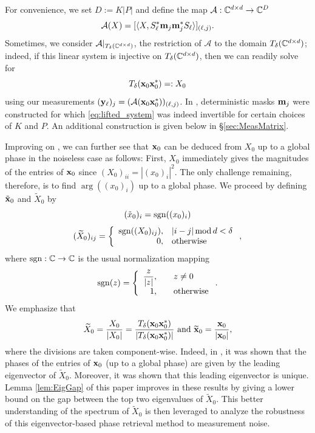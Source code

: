 For convenience, we set $D := K|P|$ and define the map $\mathcal{A} : \mathbb{C}^{d \times d} \to \mathbb{C}^D$ 
\begin{equation}\mathcal{A}(X) = [\langle X, S_\ell^* \mathbf m_j \mathbf m_j^* S_\ell \rangle]_{(\ell, j)}.\label{eq:linear}\end{equation}  
Sometimes, we consider $\mathcal{A}|_{T_{\delta}(\mathbb{C}^{d \times d})}$, the restriction of $\mathcal{A}$ to the domain $T_{\delta}(\mathbb{C}^{d \times d})$; indeed, if this linear system is injective on $T_\delta(\mathbb{C}^{d \times d})$, then we can readily solve for 
\begin{equation}T_\delta(\mathbf x_0 \mathbf x_0^*) =: X_0 \label{equdef:X0} \end{equation}  
using our measurements $(\mathbf y_\ell)_j = (\mathcal{A}(\mathbf x_0 \mathbf x_0^*))_{(\ell,j)}$.
In \cite{IVW2015_FastPhase}, deterministic masks $\mathbf m_j$ were constructed for which \eqref{eq:lifted_system} was indeed invertible for certain choices of $K$ and $P$.  An additional construction is given below in \S\ref{sec:MeasMatrix}.

Improving on \cite{IVW2015_FastPhase}, we can further see that $\mathbf x_0$ can be deduced from $X_0$ up to a global phase in the noiseless case as follows:  First, $X_0$ immediately gives the magnitudes of the entries of $\mathbf x_0$ since $(X_0)_{ii} = |(x_0)_i|^2$.  
The only challenge remaining, therefore, is to find $\arg((x_0)_i)$ up to a global phase.  We proceed by defining $\tilde{\mathbf x}_0$ and $\widetilde{X}_0$ by \[(\tilde{x}_0)_i = \mathrm{sgn}((x_0)_i)\] \[(\widetilde{X}_0)_{ij} = \left\{\begin{array}{r@{,\quad}l} \sgn((X_0)_{ij}) & |i - j| \mod d < \delta \\ 0 & \text{otherwise} \end{array}\right.,\] where $\mathrm{sgn} : \mathbb{C} \to \mathbb{C}$ is the usual normalization mapping \[\sgn(z) = \left\{\begin{array}{r@{,\qquad}l} \dfrac{z}{|z|} & z \neq 0 \\ 1 & \text{otherwise} \end{array}\right..\]  We emphasize that 
\begin{equation}
\tX_0= \frac{X_0}{|X_0|}= \frac{T_\delta(\x_0\x_0^*)}{|T_\delta(\x_0\x_0^*)|} \ \text{and} \ \widetilde{\x}_0 = \frac{\x_0}{|\x_0|},
\label{eq:X_0} 
\end{equation} 
where the divisions are taken component-wise.  Indeed, in \cite{IV_SPIE}, it was shown that the phases of the entries of $\mathbf x_0$ (up to a global phase) are given by the leading eigenvector of $\widetilde X_0$.  Moreover, it was shown that this leading eigenvector is unique.  Lemma \ref{lem:EigGap} of this paper improves in these results by giving a lower bound on the gap between the top two eigenvalues of $\widetilde X_0$.  This better understanding of the spectrum of $\widetilde X_0$ is then leveraged to analyze the robustness of this eigenvector-based phase retrieval method to measurement noise.

